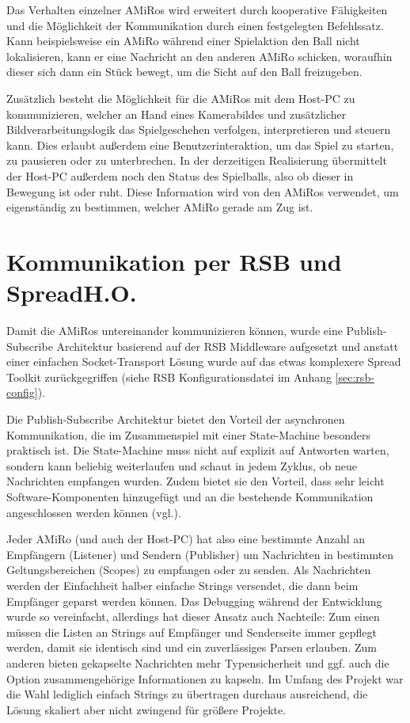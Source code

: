 Das Verhalten einzelner AMiRos wird erweitert durch kooperative Fähigkeiten und die Möglichkeit der Kommunikation durch einen festgelegten Befehlssatz. Kann beispielsweise ein AMiRo während einer Spielaktion den Ball nicht lokalisieren, kann er eine Nachricht an den anderen AMiRo schicken, woraufhin dieser sich dann ein Stück bewegt, um die Sicht auf den Ball freizugeben.

Zusätzlich besteht die Möglichkeit für die AMiRos mit dem Host-PC zu kommunizieren, welcher an Hand eines Kamerabildes und zusätzlicher Bildverarbeitungslogik das Spielgeschehen verfolgen, interpretieren und steuern kann. Dies erlaubt außerdem eine Benutzerinteraktion, um das Spiel zu starten, zu pausieren oder zu unterbrechen. In der derzeitigen Realisierung übermittelt der Host-PC außerdem noch den Status des Spielballs, also ob dieser in Bewegung ist oder ruht. Diese Information wird von den AMiRos verwendet, um eigenständig zu bestimmen, welcher AMiRo gerade am Zug ist.

\section[Kommunikation per RSB und Spread]{Kommunikation per RSB und Spread\hfill {\normalsize H.O.}}
Damit die AMiRos untereinander kommunizieren können, wurde eine Publish-Subscribe Architektur basierend auf der RSB Middleware aufgesetzt und anstatt einer einfachen Socket-Transport Lösung wurde auf das etwas komplexere Spread Toolkit zurückgegriffen (siehe RSB Konfigurationsdatei im Anhang \ref{sec:rsb-config}).

Die Publish-Subscribe Architektur bietet den Vorteil der asynchronen Kommunikation, die im Zusammenspiel mit einer State-Machine besonders praktisch ist. Die State-Machine muss nicht auf explizit auf Antworten warten, sondern kann beliebig weiterlaufen und schaut in jedem Zyklus, ob neue Nachrichten empfangen wurden. Zudem bietet sie den Vorteil, dass sehr leicht Software-Komponenten hinzugefügt und an die bestehende Kommunikation angeschlossen werden können (vgl.\cite{Siciliano:2007}).

Jeder AMiRo (und auch der Host-PC) hat also eine bestimmte Anzahl an Empfängern (Listener) und Sendern (Publisher) um Nachrichten in bestimmten Geltungsbereichen (Scopes) zu empfangen oder zu senden. Als Nachrichten werden der Einfachheit halber einfache Strings versendet, die dann beim Empfänger geparst werden können. Das Debugging während der Entwicklung wurde so vereinfacht, allerdings hat dieser Ansatz auch Nachteile: Zum einen müssen die Listen an Strings auf Empfänger und Senderseite immer gepflegt werden, damit sie identisch sind und ein zuverlässiges Parsen erlauben. Zum anderen bieten gekapselte Nachrichten mehr Typensicherheit und ggf. auch die Option zusammengehörige Informationen zu kapseln. Im Umfang des Projekt war die Wahl lediglich einfach Strings zu übertragen durchaus ausreichend, die Lösung skaliert aber nicht zwingend für größere Projekte.

